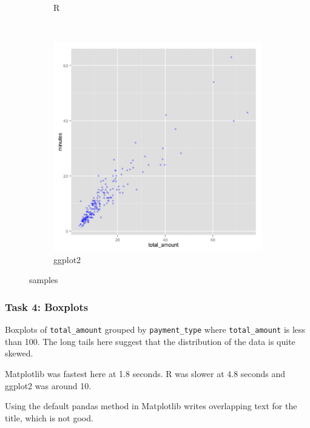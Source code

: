 \documentclass[]{article}
\begin{document}
\begin{figure}
\begin{subfigure}[b]{0.3\textwidth}
                \caption{R}
        \end{subfigure}
        ~ %
        \begin{subfigure}[b]{0.3\textwidth}
                \includegraphics[width=\textwidth]{ggplot2/sample.png}
                \caption{ggplot2}
        \end{subfigure}
        \caption{samples}
\end{figure}

\subsubsection{Task 4: Boxplots}\label{task-4-boxplots}

Boxplots of \texttt{total\_amount} grouped by \texttt{payment\_type}
where \texttt{total\_amount} is less than 100. The long tails here
suggest that the distribution of the data is quite skewed.

Matplotlib was fastest here at 1.8 seconds. R was slower at 4.8 seconds
and ggplot2 was around 10.

Using the default pandas method in Matplotlib writes overlapping text
for the title, which is not good.
\end{document}
